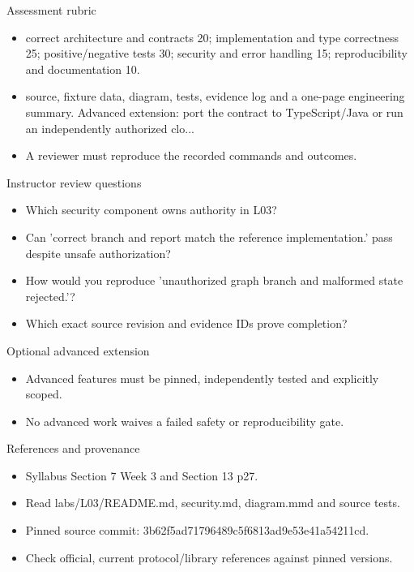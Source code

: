 \documentclass[aspectratio=169,10pt]{beamer}
\begin{document}
\begin{frame}{Assessment rubric}
\small
\begin{itemize}
\item correct architecture and contracts 20; implementation and type correctness 25; positive/negative tests 30; security and error handling 15; reproducibility and documentation 10.
\item source, fixture data, diagram, tests, evidence log and a one-page engineering summary. Advanced extension: port the contract to TypeScript/Java or run an independently authorized clo...
\item A reviewer must reproduce the recorded commands and outcomes.
\end{itemize}

\end{frame}

\begin{frame}{Instructor review questions}
\small
\begin{itemize}
\item Which security component owns authority in L03?
\item Can 'correct branch and report match the reference implementation.' pass despite unsafe authorization?
\item How would you reproduce 'unauthorized graph branch and malformed state rejected.'?
\item Which exact source revision and evidence IDs prove completion?
\end{itemize}

\end{frame}

\begin{frame}{Optional advanced extension}
\small
\begin{itemize}
\item Advanced features must be pinned, independently tested and explicitly scoped.
\item No advanced work waives a failed safety or reproducibility gate.
\end{itemize}

\end{frame}

\begin{frame}{References and provenance}
\small
\begin{itemize}
\item Syllabus Section 7 Week 3 and Section 13 p27.
\item Read labs/L03/README.md, security.md, diagram.mmd and source tests.
\item Pinned source commit: 3b62f5ad71796489c5f6813ad9e53e41a54211cd.
\item Check official, current protocol/library references against pinned versions.
\end{itemize}

\end{frame}
\end{document}
